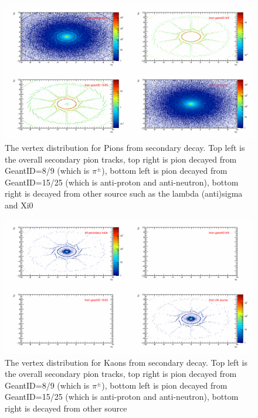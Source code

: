 \begin{figure}[htbp]
\centering
\includegraphics[keepaspectratio,width=1.0\textwidth,angle=0]{figure/Run14_D0HFT/Vtx_Pion.png}
\caption{The vertex distribution for Pions from secondary decay. Top left is the overall secondary pion tracks, top right is pion decayed from GeantID=8/9 (which is $\pi^{\pm}$), bottom left is pion decayed from GeantID=15/25 (which is anti-proton and anti-neutron), bottom right is decayed from other source such as the lambda (anti)sigma and Xi0}
\label{Vtx_Pion}
\end{figure}

\begin{figure}[htbp]
\centering
\includegraphics[keepaspectratio,width=1.0\textwidth,angle=0]{figure/Run14_D0HFT/Vtx_Kaon.png}
\caption{The vertex distribution for Kaons from secondary decay. Top left is the overall secondary pion tracks, top right is pion decayed from GeantID=8/9 (which is $\pi^{\pm}$), bottom left is pion decayed from GeantID=15/25 (which is anti-proton and anti-neutron), bottom right is decayed from other source}
\label{Vtx_Kaon}
\end{figure}


